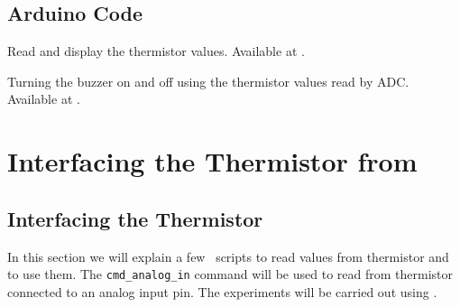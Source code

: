 \subsection{Arduino Code}
\label{sec:therm-arduino-code}

\begin{ardcode}
   {Read and display
    the thermistor values.  Available at
    .}
\label{ard:therm-read}

\end{ardcode}

\begin{ardcode}
  {Turning the buzzer on and off using the thermistor values read by
    ADC.  Available at
    .}
\label{ard:therm-buzzer}

\end{ardcode}

\section{Interfacing the Thermistor from \scilab}
\subsection{Interfacing the Thermistor}
In this section we will explain a few \scilab\ scripts to read values
from thermistor and to use them.  The {\tt cmd\_analog\_in} command
will be used to read from thermistor connected to an analog input
pin. The experiments will be carried out using \scilab.


